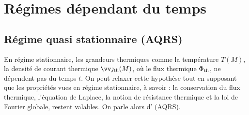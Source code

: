 \documentclass[12pt,fancy]{cours}
\begin{document}
\section{Régimes dépendant du temps}

\subsection{Régime quasi stationnaire (AQRS)}

En régime stationnaire, les grandeurs thermiques comme la température $T(M)$, la densité de courant thermique $\Vec{\jth}(M)$, où le flux thermique ${\Phi_{\rm th}}$, ne dépendent pas du temps $t$. On peut relaxer cette hypothèse tout en supposant que les propriétés vues en régime stationnaire, à savoir : la conservation du flux thermique, l'équation de Laplace, la notion de résistance thermique et la loi de Fourier globale, restent valables. On parle alors d' (AQRS).
\end{document}

